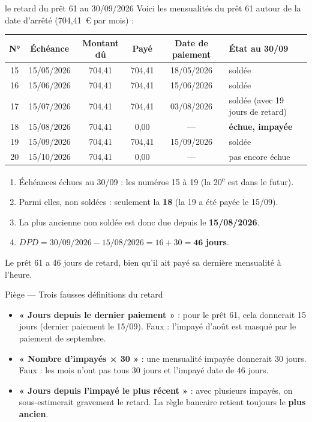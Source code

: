 \begin{calcul}{le retard du prêt 61 au 30/09/2026}
Voici les mensualités du prêt 61 autour de la date d'arrêté (704,41~€ par mois) :

\begin{center}\small
\begin{tabular}{@{}cccccl@{}}
\toprule
N° & Échéance & Montant dû & Payé & Date de paiement & État au 30/09 \\
\midrule
15 & 15/05/2026 & 704,41 & 704,41 & 18/05/2026 & soldée \\
16 & 15/06/2026 & 704,41 & 704,41 & 15/06/2026 & soldée \\
17 & 15/07/2026 & 704,41 & 704,41 & 03/08/2026 & soldée (avec 19 jours de retard) \\
\rowcolor{rougeFond} 18 & 15/08/2026 & 704,41 & 0,00 & --- & \textbf{échue, impayée} \\
19 & 15/09/2026 & 704,41 & 704,41 & 15/09/2026 & soldée \\
20 & 15/10/2026 & 704,41 & 0,00 & --- & pas encore échue \\
\bottomrule
\end{tabular}
\end{center}

\begin{enumerate}
\item Échéances échues au 30/09 : les numéros 15 à 19 (la 20\textsuperscript{e} est dans le futur).
\item Parmi elles, non soldées : seulement la \textbf{18} (la 19 a été payée le 15/09).
\item La plus ancienne non soldée est donc due depuis le \textbf{15/08/2026}.
\item $DPD = 30/09/2026 - 15/08/2026 = 16 + 30 = \mathbf{46}$ \textbf{jours}.
\end{enumerate}
Le prêt 61 a 46 jours de retard, bien qu'il ait payé sa dernière mensualité à l'heure.
\end{calcul}

\begin{piege}{Piège --- Trois fausses définitions du retard}
\begin{itemize}
\item \textbf{« Jours depuis le dernier paiement »} : pour le prêt 61, cela donnerait 15 jours (dernier
paiement le 15/09). Faux : l'impayé d'août est masqué par le paiement de septembre.
\item \textbf{« Nombre d'impayés × 30 »} : une mensualité impayée donnerait 30 jours. Faux : les mois
n'ont pas tous 30 jours et l'impayé date de 46 jours.
\item \textbf{« Jours depuis l'impayé le plus récent »} : avec plusieurs impayés, on sous-estimerait
gravement le retard. La règle bancaire retient toujours le \textbf{plus ancien}.
\end{itemize}
\end{piege}

